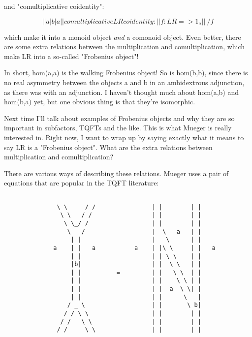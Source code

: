 and "comultiplicative coidentity":




$$

                            |   |    
                     a      | b |     a 
                            |   |                    comultiplicative
                            L   R                       coidentity:
                            |   |                      f: LR => 1_{a}
                            |   |
                             \ /
                              f
$$
    
which make it into a monoid object \emph{and} a comonoid object.  Even
better, there are some extra relations between the multiplication and
comultiplication, which make LR into a so-called "Frobenius object"!

In short, hom(a,a) is the walking Frobenius object!  So is hom(b,b),
since there is no real asymmetry between the objects a and b in an
ambidextrous adjunction, as there was with an adjunction.  I haven't
thought much about hom(a,b) and hom(b,a) yet, but one obvious thing is
that they're isomorphic.


Next time I'll talk about examples of Frobenius objects and why they are
so important in subfactors, TQFTs and the like.  This is what Mueger is
really interested in.  Right now, I want to wrap up by saying exactly
what it means to say LR is a "Frobenius object".  What are the
extra relations between multiplication and comultiplication?

There are various ways of describing these relations.   Mueger uses
a pair of equations that are popular in the TQFT literature:

                                      

\begin{verbatim}

               \ \     / /                | |        | |
                \ \   / /                 | |        | |
                 \ \_/ /                  | |        | |
                  \   /                   |  \   a   | |
                   | |                    |   \      | |
              a    | |   a           a    | |\ \     | |   a
                   | |                    | | \ \    | |
                   |b|                    | |  \ \   | |
                   | |          =         | |   \ \  | |
                   | |                    | |    \ \ | |
                   | |                    | |  a  \ \| |
                   | |                    | |      \   |
                  / _ \                   | |       \ b|
                 / / \ \                  | |        | |
                / /   \ \                 | |        | | 
               / /     \ \                | |        | |
\end{verbatim}
    
